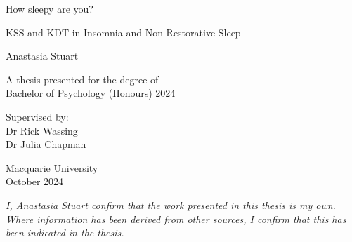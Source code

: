 \documentclass[12pt,a4paper,]{report}
\begin{document}
\begin{titlepage}
    \begin{center}


        \vspace*{2.5cm}

        \huge
        How sleepy are you?

                \vspace{.5cm}

        \Large
        KSS and KDT in Insomnia and Non-Restorative Sleep
        

        \vspace{1.5cm}

        \Large
        Anastasia Stuart

        \vspace{1.5cm}

        \normalsize
        A thesis presented for the degree of\\
        Bachelor of Psychology (Honours) 2024

        \vfill

        \normalsize
        Supervised by:\\
        Dr Rick Wassing \\ Dr Julia Chapman

        \vspace{0.8cm}


        \normalsize
        Macquarie University\\
        October 2024


    \end{center}
\end{titlepage}


\vspace*{\fill}

\noindent \textit{
I, Anastasia Stuart confirm that the work presented in this thesis is my own. Where information has been derived from other sources, I confirm that this has been indicated in the thesis.
} \vspace*{\fill}  \newpage
\end{document}
